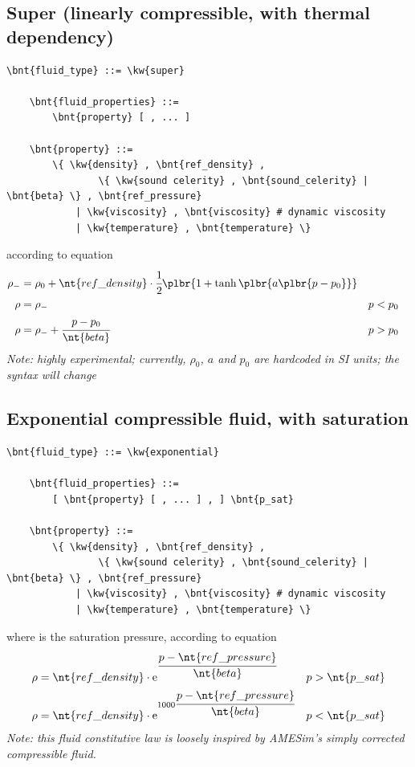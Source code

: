 \subsection{Super (linearly compressible, with thermal dependency)}
\begin{Verbatim}[commandchars=\\\{\}]
    \bnt{fluid_type} ::= \kw{super}

    \bnt{fluid_properties} ::= 
        \bnt{property} [ , ... ]

    \bnt{property} ::=
        \{ \kw{density} , \bnt{ref_density} ,
                \{ \kw{sound celerity} , \bnt{sound_celerity} | \bnt{beta} \} , \bnt{ref_pressure}
            | \kw{viscosity} , \bnt{viscosity} # dynamic viscosity
            | \kw{temperature} , \bnt{temperature} \}
\end{Verbatim}
according to equation
\begin{align}
	\rho_-
	&=
	\rho_0 + \nt{ref\_density} \cdot \cfrac{1}{2}\plbr{
		1 + \tanh\plbr{a\plbr{p - p_0}}
	}
	\nonumber \\
	\rho
	&=
	\rho_-
		& p &< p_0
	\\
	\rho
	&=
	\rho_- + \cfrac{p - p_0}{\nt{beta}}
		& p &> p_0
	\nonumber
\end{align}
\emph{Note: highly experimental; currently, $\rho_0$, $a$ and $p_0$
are hardcoded in SI units; the syntax will change}

\subsection{Exponential compressible fluid, with saturation}
\begin{Verbatim}[commandchars=\\\{\}]
    \bnt{fluid_type} ::= \kw{exponential}

    \bnt{fluid_properties} ::= 
        [ \bnt{property} [ , ... ] , ] \bnt{p_sat}

    \bnt{property} ::=
        \{ \kw{density} , \bnt{ref_density} ,
                \{ \kw{sound celerity} , \bnt{sound_celerity} | \bnt{beta} \} , \bnt{ref_pressure}
            | \kw{viscosity} , \bnt{viscosity} # dynamic viscosity
            | \kw{temperature} , \bnt{temperature} \}
\end{Verbatim}
where  is the saturation pressure, according to equation
\begin{align}
	\rho &= \nt{ref\_density} \cdot \text{e}^{\cfrac{p - \nt{ref\_pressure}}{\nt{beta}}}
		& p &> \nt{p\_sat}
	\nonumber \\
	\rho &= \nt{ref\_density} \cdot \text{e}^{1000\cfrac{p - \nt{ref\_pressure}}{\nt{beta}}}
		& p &< \nt{p\_sat}
\end{align}
\emph{Note: this fluid constitutive law is loosely inspired by AMESim's
simply corrected compressible fluid.}



